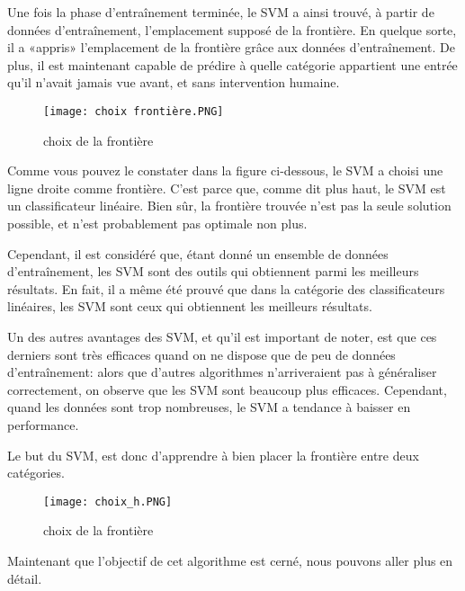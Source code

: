 \documentclass{article}
\begin{document}
Une fois la phase d’entraînement terminée, le SVM a ainsi trouvé, à partir de données d’entraînement, l’emplacement supposé de la frontière. 
En quelque sorte, il a «appris» l’emplacement de la frontière grâce aux données d’entraînement. 
De plus, il est maintenant capable de prédire à quelle catégorie appartient une entrée qu’il n’avait jamais vue avant, et sans intervention humaine.
\vspace{5mm} %
\begin{figure}[b!]
  \texttt{[image: choix frontière.PNG]}
  \caption{choix de la frontière}
  \label{fig2}
\end{figure}
\vspace{5mm} %
Comme vous pouvez le constater dans la figure ci-dessous, le SVM a choisi une ligne droite comme frontière. 
C’est parce que, comme dit plus haut, le SVM est un classificateur linéaire. 
Bien sûr, la frontière trouvée n’est pas la seule solution possible, et n’est probablement pas optimale non plus.

Cependant, il est considéré que, étant donné un ensemble de données d’entraînement, les SVM sont des outils qui obtiennent parmi les meilleurs résultats.
En fait, il a même été prouvé que dans la catégorie des classificateurs linéaires, les SVM sont ceux qui obtiennent les meilleurs résultats.

Un des autres avantages des SVM, et qu’il est important de noter, est que ces derniers sont très efficaces quand on ne dispose que de peu de données d’entraînement: alors que d’autres algorithmes n’arriveraient pas à généraliser correctement, on observe que les SVM sont beaucoup plus efficaces. 
Cependant, quand les données sont trop nombreuses, le SVM a tendance à baisser en performance.

Le but du  SVM, est donc  d’apprendre à bien placer la frontière entre deux catégories. 

\vspace{5mm} %
\begin{figure}[b!]
  \texttt{[image: choix\_h.PNG]}
  \caption{choix de la frontière}
  \label{fig3:}
\end{figure}
\vspace{5mm} %

\vspace{5mm} %
Maintenant que l'objectif de cet algorithme est cerné, nous pouvons aller plus en détail.
\vspace{5mm} %
\end{document}
